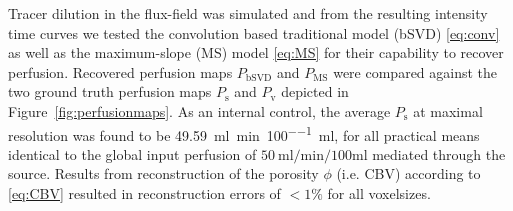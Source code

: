 \documentclass[final,5p,times,twocolumn]{elsarticle}
\begin{document}
	
	Tracer dilution in the flux-field was simulated and from the resulting intensity time curves we tested the convolution based traditional model (bSVD) \eqref{eq:conv} as well as the maximum-slope (MS) model \eqref{eq:MS} for their capability to recover perfusion. Recovered perfusion maps $P_{\mathrm{bSVD}}$ and $P_{\mathrm{MS}}$ were compared against the two ground truth perfusion maps $P_{\mathrm{s}}$ and $P_{\mathrm{v}}$ depicted in Figure~\ref{fig:perfusionmaps}. As an internal control, the average $P_{\mathrm{s}}$ at maximal resolution was found to be \SI{49.59}{\milli\litre\per\minute\per100\milli\litre}, for all practical means identical to the global input perfusion of $\SI{50}{\milli\litre\per\minute\per100\milli\litre}$ mediated through the source.	Results from reconstruction of the porosity $\phi$ (i.e. CBV) according to \eqref{eq:CBV} resulted in reconstruction errors of $<1\%$ for all voxelsizes. 
	
\end{document}
